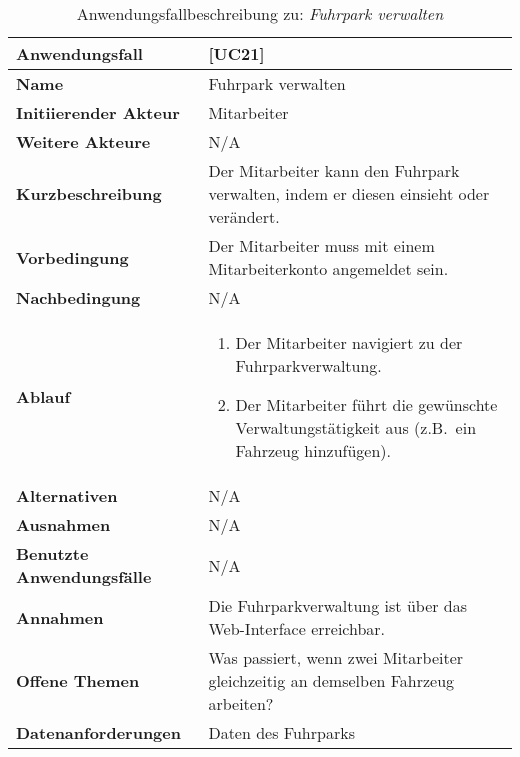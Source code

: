 \begin{table}[H]
    \centering
    \caption{Anwendungsfallbeschreibung zu: \emph{Fuhrpark verwalten}}
    \label{tab:anwendungsfallbeschreibung_fuhrpark}
    \begin{tabularx}{\textwidth}{|l|X|}
        \toprule
        \textbf{Anwendungsfall}           & [UC21]                                                                                \\
        \hline
        \textbf{Name}                     & Fuhrpark verwalten                                                                    \\
        \hline
        \textbf{Initiierender Akteur}     & Mitarbeiter                                                                           \\
        \hline
        \textbf{Weitere Akteure}          & N/A                                                                                   \\
        \hline
        \textbf{Kurzbeschreibung}         & Der Mitarbeiter kann den Fuhrpark verwalten, indem er diesen einsieht oder verändert. \\
        \hline
        \textbf{Vorbedingung}             & Der Mitarbeiter muss mit einem Mitarbeiterkonto angemeldet sein.                      \\
        \hline
        \textbf{Nachbedingung}            & N/A                                                                                   \\
        \hline
        \textbf{Ablauf} &
        \begin{enumerate}
            \item Der Mitarbeiter navigiert zu der Fuhrparkverwaltung.
            \item Der Mitarbeiter führt die gewünschte Verwaltungstätigkeit aus (z.B.\ ein Fahrzeug hinzufügen).
        \end{enumerate} \\
        \hline
        \textbf{Alternativen}             & N/A                                                                                   \\
        \hline
        \textbf{Ausnahmen}                & N/A                                                                                   \\
        \hline
        \textbf{Benutzte Anwendungsfälle} & N/A                                                                                   \\
        \hline
        \textbf{Annahmen}                 & Die Fuhrparkverwaltung ist über das Web-Interface erreichbar.                         \\
        \hline
        \textbf{Offene Themen}            & Was passiert, wenn zwei Mitarbeiter gleichzeitig an demselben Fahrzeug arbeiten?      \\
        \hline
        \textbf{Datenanforderungen}       & Daten des Fuhrparks                                                                   \\
        \bottomrule
    \end{tabularx}
\end{table}